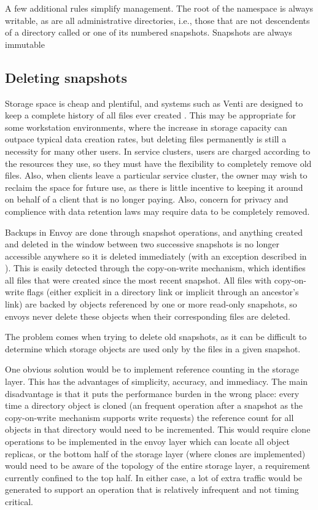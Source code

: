 A few additional rules simplify management. The root of the namespace is always writable, as are all administrative directories, i.e., those that are not descendents of a directory called \current or one of its numbered snapshots. Snapshots are always immutable

\subsection{Deleting snapshots}

Storage space is cheap and plentiful, and systems such as Venti are designed to keep a complete history of all files ever created \cite{quinlan}. This may be appropriate for some workstation environments, where the increase in storage capacity can outpace typical data creation rates, but deleting files permanently is still a necessity for many other users. In service clusters, users are charged according to the resources they use, so they must have the flexibility to completely remove old files. Also, when clients leave a particular service cluster, the owner may wish to reclaim the space for future use, as there is little incentive to keeping it around on behalf of a client that is no longer paying. Also, concern for privacy and complience with data retention laws may require data to be completely removed.

Backups in Envoy are done through snapshot operations, and anything created and deleted in the window between two successive snapshots is no longer accessible anywhere so it is deleted immediately (with an exception described in ). This is easily detected through the copy-on-write mechanism, which identifies all files that were created since the most recent snapshot. All files with copy-on-write flags (either explicit in a directory link or implicit through an ancestor's link) are backed by objects referenced by one or more read-only snapshots, so envoys never delete these objects when their corresponding files are deleted.

The problem comes when trying to delete old snapshots, as it can be difficult to determine which storage objects are used only by the files in a given snapshot.

One obvious solution would be to implement reference counting in the storage layer. This has the advantages of simplicity, accuracy, and immediacy. The main disadvantage is that it puts the performance burden in the wrong place: every time a directory object is cloned (an frequent operation after a snapshot as the copy-on-write mechanism supports write requests) the reference count for all objects in that directory would need to be incremented. This would require clone operations to be implemented in the envoy layer which can locate all object replicas, or the bottom half of the storage layer (where clones are implemented) would need to be aware of the topology of the entire storage layer, a requirement currently confined to the top half. In either case, a lot of extra traffic would be generated to support an operation that is relatively infrequent and not timing critical.

